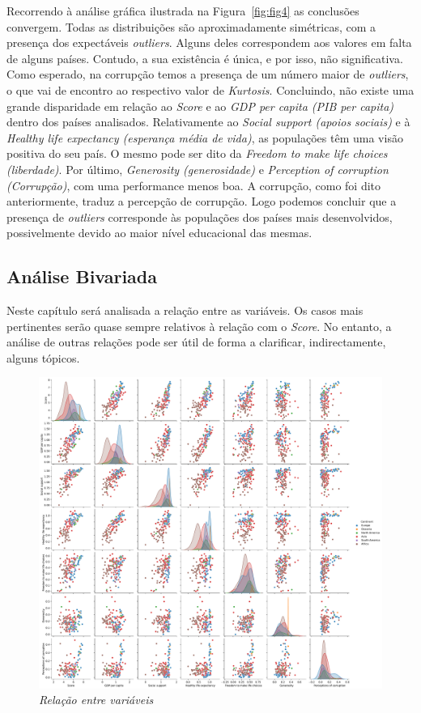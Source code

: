 \documentclass[12pt, a4paper]{article}
\begin{document}
Recorrendo à análise gráfica ilustrada na Figura~\ref{fig:fig4} as conclusões convergem. Todas as distribuições são aproximadamente simétricas, com a presença dos
expectáveis \emph{outliers}. Alguns deles correspondem aos valores em
falta de alguns países. Contudo, a sua existência é única, e por isso,
não significativa. Como esperado, na
corrupção temos a presença de um número maior de \emph{outliers}, o que
vai de encontro ao respectivo valor de
\emph{Kurtosis}. Concluindo, não existe uma
grande disparidade em relação ao \emph{Score} e ao \emph{GDP per capita
(PIB per capita)} dentro dos países analisados. Relativamente ao
\emph{Social support (apoios sociais)} e à \emph{Healthy life expectancy
(esperança média de vida)}, as populações têm uma visão positiva do seu
país. O mesmo pode ser dito da \emph{Freedom to make life choices
(liberdade)}. Por último, \emph{Generosity (generosidade)} e
\emph{Perception of corruption (Corrupção)}, com uma performance menos
boa. A corrupção, como foi dito anteriormente, traduz a percepção de
corrupção. Logo podemos concluir que a presença de \emph{outliers}
corresponde às populações dos países mais desenvolvidos, possivelmente
devido ao maior nível educacional das mesmas.



\subsection{Análise Bivariada} %
\label{sub:análise_bivariada}

Neste capítulo será analisada a relação entre as variáveis. Os casos
mais pertinentes serão quase sempre relativos à relação com o
\emph{Score}. No entanto, a análise de outras relações pode ser útil de
forma a clarificar, indirectamente, alguns tópicos.

\begin{figure}[h]
\includegraphics[scale=0.35]{pairplots.pdf}
\centering
\caption{\emph{Relação entre variáveis}}
\label{fig:fig5}
\end{figure}
\end{document}
